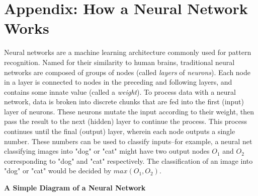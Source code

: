 \documentclass[11pt, a4paper]{article}
\begin{document}
\section{Appendix: How a Neural Network Works}
\label{sec:neuralnet}
Neural networks are a machine learning architecture commonly used for pattern recognition. Named for their 
similarity to human brains, traditional neural networks are composed of groups of nodes (called 
\textit{layers} of \textit{neurons}). Each node in a layer is connected to nodes in the preceding and following
layers, and contains some innate value (called a \textit{weight}). To process data with a neural network, data
is broken into discrete chunks that are fed into the first (input) layer of neurons. These neurons mutate the 
input according to their weight, then pass the result to the next (hidden) layer to continue the process. This 
process continues until the final (output) layer, wherein each node outputs a single number. These numbers can 
be used to classify inputs--for example, a neural net classifying images into "dog" or "cat" might have two
output nodes $O_1$ and $O_2$ corresponding to "dog" and "cat" respectively. The classification of an image into
"dog" or "cat" would be decided by $max(O_1, O_2)$. \\
\begin{center}
    \textbf{A Simple Diagram of a Neural Network}\\
    
\end{center}
\end{document}
